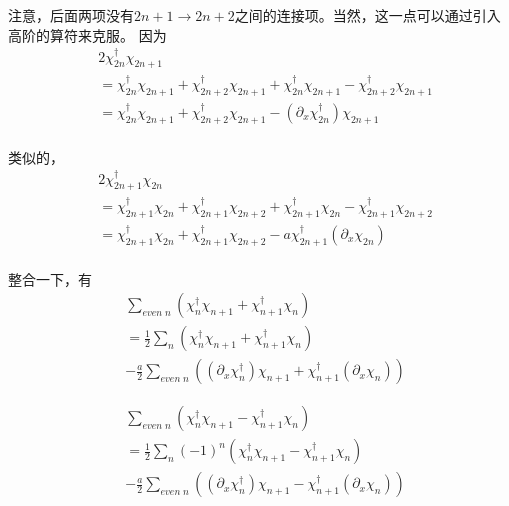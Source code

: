 注意，后面两项没有$2n+1 \to 2n+2$之间的连接项。当然，这一点可以通过引入高阶的算符来克服。
因为
\begin{equation}
\begin{split}
&2\chi ^{\dagger}_{2n}\chi _{2n+1}\\
&=\chi ^{\dagger}_{2n}\chi _{2n+1}+\chi ^{\dagger}_{2n+2}\chi _{2n+1}+\chi ^{\dagger}_{2n}\chi _{2n+1}-\chi ^{\dagger}_{2n+2}\chi _{2n+1}\\
&=\chi ^{\dagger}_{2n}\chi _{2n+1}+\chi ^{\dagger}_{2n+2}\chi _{2n+1}-(\partial _x \chi ^{\dagger}_{2n})\chi _{2n+1}\\
\end{split}
\end{equation}


类似的，
\begin{equation}
\begin{split}
&2\chi ^{\dagger}_{2n+1}\chi _{2n}\\
&=\chi ^{\dagger}_{2n+1}\chi _{2n}+\chi ^{\dagger}_{2n+1}\chi _{2n+2}+\chi ^{\dagger}_{2n+1}\chi _{2n}-\chi ^{\dagger}_{2n+1}\chi _{2n+2}\\
&=\chi ^{\dagger}_{2n+1}\chi _{2n}+\chi ^{\dagger}_{2n+1}\chi _{2n+2}-a\chi^{\dagger}_{2n+1}(\partial _x \chi _{2n})\\
\end{split}
\end{equation}

整合一下，有
\begin{equation}
\begin{split}
&\sum _{even\;n}\left(\chi ^{\dagger}_{n}\chi _{n+1}+\chi ^{\dagger}_{n+1}\chi _{n}\right)\\
&=\frac{1}{2}\sum _{n}\left(\chi ^{\dagger}_{n}\chi _{n+1}+ \chi ^{\dagger}_{n+1}\chi _{n}\right)\\
&-\frac{a}{2}\sum _{even\;n} \left((\partial _x \chi ^{\dagger}_{n})\chi _{n+1} + \chi^{\dagger}_{n+1}(\partial _x \chi _{n})\right)
\end{split}
\end{equation}

\begin{equation}
\begin{split}
&\sum _{even\;n}\left(\chi ^{\dagger}_{n}\chi _{n+1}-\chi ^{\dagger}_{n+1}\chi _{n}\right)\\
&=\frac{1}{2}\sum _{n}(-1)^n\left(\chi ^{\dagger}_{n}\chi _{n+1}- \chi ^{\dagger}_{n+1}\chi _{n}\right)\\
&-\frac{a}{2}\sum _{even\;n} \left((\partial _x \chi ^{\dagger}_{n})\chi _{n+1} - \chi^{\dagger}_{n+1}(\partial _x \chi _{n})\right)
\end{split}
\end{equation}


